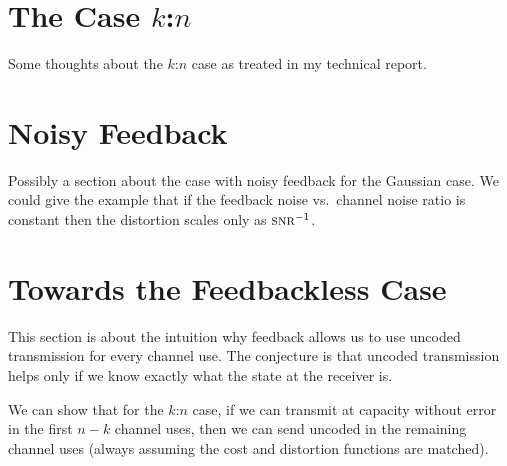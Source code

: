 \section{The Case $k$:$n$}

Some thoughts about the $k$:$n$ case as treated in my technical report.


\section{Noisy Feedback}

Possibly a section about the case with noisy feedback for the Gaussian case. We
could give the example that if the feedback noise vs.\ channel noise ratio is
constant then the distortion scales only as $\snr^{-1}$.

\section{Towards the Feedbackless Case}

This section is about the intuition why feedback allows us to use uncoded
transmission for every channel use. The conjecture is that uncoded transmission
helps only if we know exactly what the state at the receiver is. 

We can show that for the $k$:$n$ case, if we can transmit at capacity without
error in the first $n-k$ channel uses, then we can send uncoded in the remaining
channel uses (always assuming the cost and distortion functions are matched).

